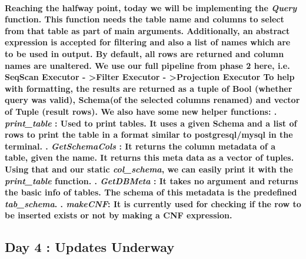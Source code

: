 \documentclass{article}
\begin{document}
\paragraph{
    Reaching the halfway point, today we will be implementing the \textit{Query} function.
    This function needs the table name and columns to select from that table as part of main arguments.
    Additionally, an abstract expression is accepted for filtering and also a list of names which are to be used in output.
    By default, all rows are returned and column names are unaltered.
    We use our full pipeline from phase 2 here, i.e. \newline
    \textbf{SeqScan Executor - \textgreater Filter Executor - \textgreater Projection Executor} \newline
    To help with formatting, the results are returned as a tuple of Bool (whether query was valid),
    Schema(of the selected columns renamed) and vector of Tuple (result rows).
    \newline \newline
    We also have some new helper functions: \newline \newline {}. \textit{print\_table} : Used to print tables. It uses a given Schema and a list of rows to print the table
    in a format similar to postgresql/mysql in the terminal.
    \newline {}. \textit{GetSchemaCols} : It returns the column metadata of a table, given the name. It returns this meta data as a vector of tuples.
    Using that and our static \textit{col\_schema}, we can easily print it with the \textit{print\_table} function.
    \newline {}. \textit{GetDBMeta} : It takes no argument and returns the basic info of tables. The schema of this metadata is the predefined 
    \textit{tab\_schema}.
    \newline {}. \textit{makeCNF}: It is currently used for checking if the row to be inserted exists or not by making a CNF expression.
}
\newpage
\subsection{Day 4 : Updates Underway}
\end{document}
